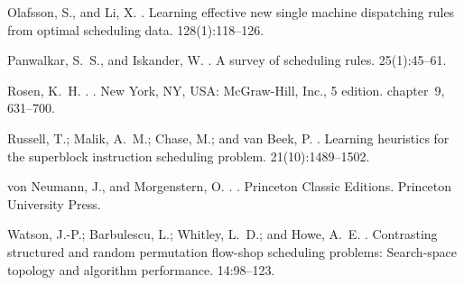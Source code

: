 \documentclass[letterpaper]{article}
\begin{document}
\begin{thebibliography}{}
Olafsson, S., and Li, X.
.
\newblock Learning effective new single machine dispatching rules from optimal
  scheduling data.
 128(1):118--126.

Panwalkar, S.~S., and Iskander, W.
.
\newblock A survey of scheduling rules.
 25(1):45--61.

Rosen, K.~H.
.
.
\newblock New York, NY, USA: McGraw-Hill, Inc., 5 edition.
\newblock chapter~9,  631--700.

Russell, T.; Malik, A.~M.; Chase, M.; and van Beek, P.
.
\newblock Learning heuristics for the superblock instruction scheduling
  problem.
 21(10):1489--1502.

von Neumann, J., and Morgenstern, O.
.
.
\newblock Princeton Classic Editions. Princeton University Press.

Watson, J.-P.; Barbulescu, L.; Whitley, L.~D.; and Howe, A.~E.
.
\newblock Contrasting structured and random permutation flow-shop scheduling
  problems: Search-space topology and algorithm performance.
 14:98--123.

\end{thebibliography}
\end{document}

